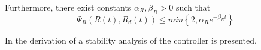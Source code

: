 Furthermore, there exist constants $ \alpha_R,\beta_R>0 $ such that
\begin{equation}\label{key}
\Psi_R(R(t),R_d(t)) \leq min\left\lbrace 2,\alpha_Re^{-\beta_Rt}\right\rbrace 
\end{equation}



In \cite{Lee2010} the derivation of a stability analysis of the controller is presented. 


